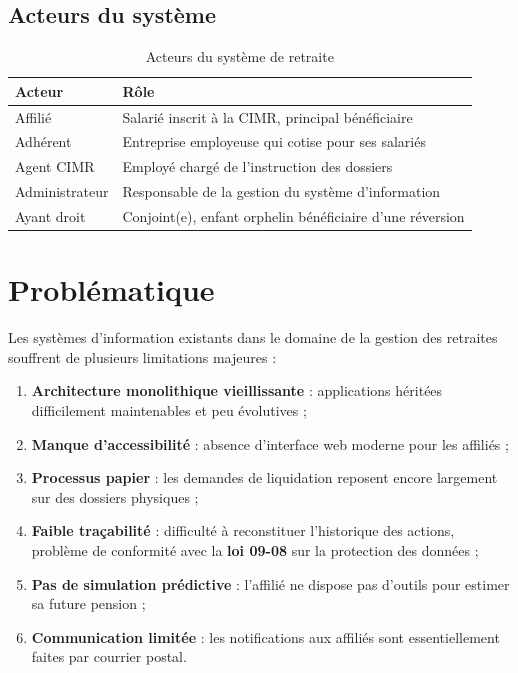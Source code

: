 \documentclass[12pt,a4paper,oneside]{report}
\begin{document}
\subsection{Acteurs du système}
\begin{table}[H]
\centering
\caption{Acteurs du système de retraite}
\begin{tabular}{ll}
\toprule
\textbf{Acteur} & \textbf{Rôle} \\
\midrule
Affilié & Salarié inscrit à la CIMR, principal bénéficiaire \\
Adhérent & Entreprise employeuse qui cotise pour ses salariés \\
Agent CIMR & Employé chargé de l'instruction des dossiers \\
Administrateur & Responsable de la gestion du système d'information \\
Ayant droit & Conjoint(e), enfant orphelin bénéficiaire d'une réversion \\
\bottomrule
\end{tabular}
\end{table}

\section{Problématique}
Les systèmes d'information existants dans le domaine de la gestion des retraites souffrent de plusieurs limitations majeures :
\begin{enumerate}
    \item \textbf{Architecture monolithique vieillissante} : applications héritées difficilement maintenables et peu évolutives ;
    \item \textbf{Manque d'accessibilité} : absence d'interface web moderne pour les affiliés ;
    \item \textbf{Processus papier} : les demandes de liquidation reposent encore largement sur des dossiers physiques ;
    \item \textbf{Faible traçabilité} : difficulté à reconstituer l'historique des actions, problème de conformité avec la \textbf{loi 09-08} sur la protection des données ;
    \item \textbf{Pas de simulation prédictive} : l'affilié ne dispose pas d'outils pour estimer sa future pension ;
    \item \textbf{Communication limitée} : les notifications aux affiliés sont essentiellement faites par courrier postal.
\end{enumerate}
\end{document}
